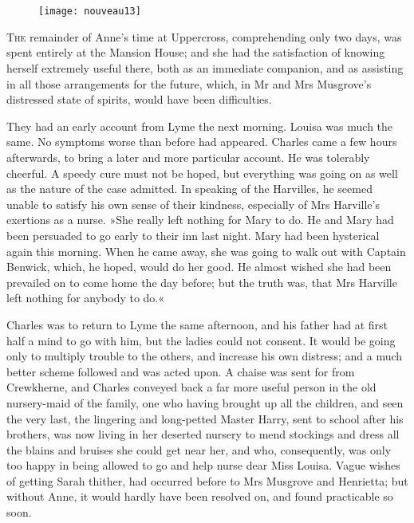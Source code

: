 \chapter[Chapter \thechapter]{}

\begin{figure}[t!]
\centering
\texttt{[image: nouveau13]}
\end{figure}

\lettrine[lines=4,lraise=0.3]{T}{he} remainder of Anne's time at Uppercross, comprehending only two days, was spent entirely at the Mansion House; and she had the satisfaction of knowing herself extremely useful there, both as an immediate companion, and as assisting in all those arrangements for the future, which, in Mr and Mrs Musgrove's distressed state of spirits, would have been difficulties.

They had an early account from Lyme the next morning. Louisa was much the same. No symptoms worse than before had appeared. Charles came a few hours afterwards, to bring a later and more particular account. He was tolerably cheerful. A speedy cure must not be hoped, but everything was going on as well as the nature of the case admitted. In speaking of the Harvilles, he seemed unable to satisfy his own sense of their kindness, especially of Mrs Harville's exertions as a nurse. »She really left nothing for Mary to do. He and Mary had been persuaded to go early to their inn last night. Mary had been hysterical again this morning. When he came away, she was going to walk out with Captain Benwick, which, he hoped, would do her good. He almost wished she had been prevailed on to come home the day before; but the truth was, that Mrs Harville left nothing for anybody to do.«

Charles was to return to Lyme the same afternoon, and his father had at first half a mind to go with him, but the ladies could not consent. It would be going only to multiply trouble to the others, and increase his own distress; and a much better scheme followed and was acted upon. A chaise was sent for from Crewkherne, and Charles conveyed back a far more useful person in the old nursery-maid of the family, one who having brought up all the children, and seen the very last, the lingering and long-petted Master Harry, sent to school after his brothers, was now living in her deserted nursery to mend stockings and dress all the blains and bruises she could get near her, and who, consequently, was only too happy in being allowed to go and help nurse dear Miss Louisa. Vague wishes of getting Sarah thither, had occurred before to Mrs Musgrove and Henrietta; but without Anne, it would hardly have been resolved on, and found practicable so soon.


